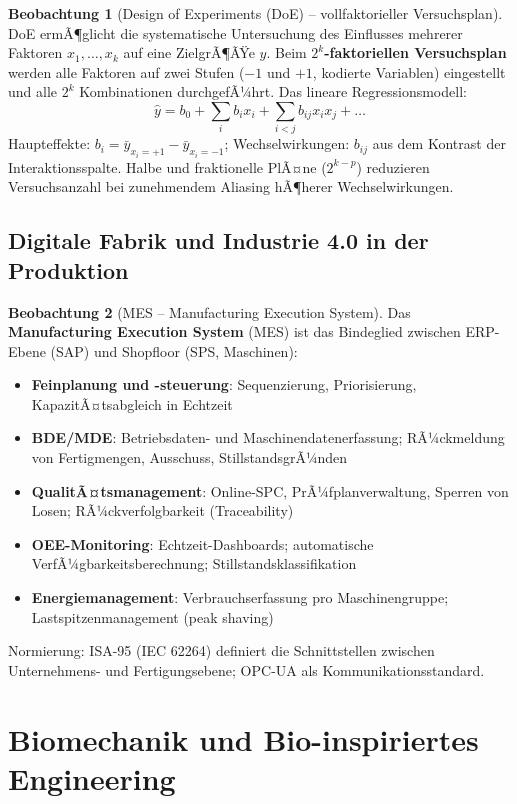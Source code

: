 ﻿\documentclass[a4paper,12pt]{report}
\theoremstyle{definition}
\newtheorem{beobachtung}{Beobachtung}
\begin{document}
\begin{beobachtung}[Design of Experiments (DoE) -- vollfaktorieller Versuchsplan]
DoE ermÃ¶glicht die systematische Untersuchung des Einflusses mehrerer
Faktoren $x_1, \ldots, x_k$ auf eine ZielgrÃ¶ÃŸe $y$.
Beim \textbf{$2^k$-faktoriellen Versuchsplan} werden alle Faktoren
auf zwei Stufen ($-1$ und $+1$, kodierte Variablen) eingestellt
und alle $2^k$ Kombinationen durchgefÃ¼hrt.
Das lineare Regressionsmodell:
\[
  \hat{y} = b_0 + \sum_i b_i x_i + \sum_{i<j} b_{ij}x_ix_j + \ldots
\]
Haupteffekte: $b_i = \bar{y}_{x_i=+1} - \bar{y}_{x_i=-1}$;
Wechselwirkungen: $b_{ij}$ aus dem Kontrast der Interaktionsspalte.
Halbe und fraktionelle PlÃ¤ne ($2^{k-p}$) reduzieren Versuchsanzahl
bei zunehmendem Aliasing hÃ¶herer Wechselwirkungen.
\end{beobachtung}

\section{Digitale Fabrik und Industrie 4.0 in der Produktion}

\begin{beobachtung}[MES -- Manufacturing Execution System]
Das \textbf{Manufacturing Execution System} (MES) ist das Bindeglied
zwischen ERP-Ebene (SAP) und Shopfloor (SPS, Maschinen):
\begin{itemize}
    \item[-] \textbf{Feinplanung und -steuerung}: Sequenzierung, Priorisierung,
          KapazitÃ¤tsabgleich in Echtzeit
    \item[-] \textbf{BDE/MDE}: Betriebsdaten- und Maschinendatenerfassung;
          RÃ¼ckmeldung von Fertigmengen, Ausschuss, StillstandsgrÃ¼nden
    \item[-] \textbf{QualitÃ¤tsmanagement}: Online-SPC, PrÃ¼fplanverwaltung,
          Sperren von Losen; RÃ¼ckverfolgbarkeit (Traceability)
    \item[-] \textbf{OEE-Monitoring}: Echtzeit-Dashboards; automatische
          VerfÃ¼gbarkeitsberechnung; Stillstandsklassifikation
    \item[-] \textbf{Energiemanagement}: Verbrauchserfassung pro Maschinengruppe;
          Lastspitzenmanagement (peak shaving)
\end{itemize}
Normierung: ISA-95 (IEC 62264) definiert die Schnittstellen zwischen
Unternehmens- und Fertigungsebene; OPC-UA als Kommunikationsstandard.
\end{beobachtung}

\chapter{Biomechanik und Bio-inspiriertes Engineering}
\end{document}
